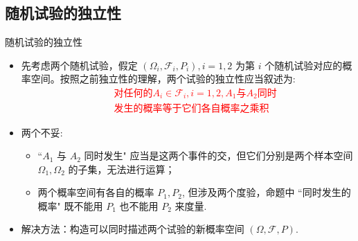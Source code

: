 \documentclass[Prob-All.tex]{subfiles}
\begin{document}
\subsection{随机试验的独立性}
 \begin{frame}{随机试验的独立性}

  \begin{itemize}[<+-|alert@+>]
  \item 先考虑两个随机试验，假定 $(\Omega_i,\mathcal{F}_i,P_i), i=1,2$ 为第 $i$ 个随机试验对应的概率空间。按照之前独立性的理解，两个试验的独立性应当叙述为:\pause
   \textcolor{red}{ \begin{eqnarray*}
      &&\mbox{对任何的} A_i\in\mathcal{F}_i, i=1,2, A_1\mbox{与} A_2\mbox{同时}\\
      &&\mbox{发生的概率等于它们各自概率之乘积}
    \end{eqnarray*}}%
\item 两个不妥:
  \begin{itemize}[<+-|alert@+>]
  \item ``$A_1$ 与 $A_2$ 同时发生" 应当是这两个事件的交，但它们分别是两个样本空间 $\Omega_1,\Omega_2$ 的子集，无法进行运算；
  \item 两个概率空间有各自的概率 $P_1, P_2$, 但涉及两个度验，命题中 ``同时发生的概率" 既不能用 $P_1$ 也不能用 $P_2$ 来度量.
  \end{itemize}
\item 解决方法：构造可以同时描述两个试验的新概率空间 $(\Omega,\mathcal{F},P)$.
  \end{itemize}
\end{frame}
\end{document}
